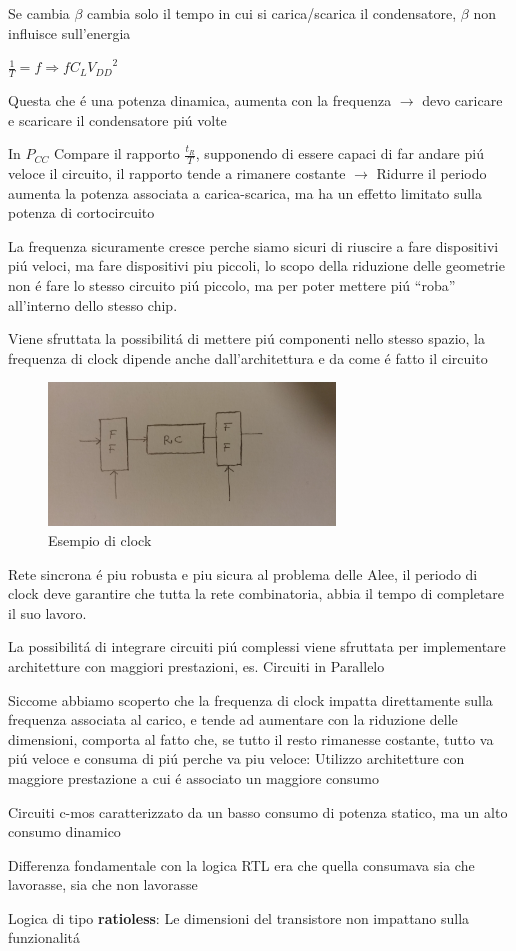 Se cambia $\beta$ cambia solo il tempo in cui si carica/scarica il condensatore, $\beta$ non influisce sull'energia

$ \frac{1}{T} = f  \Rightarrow  f C_L {V_{DD}}^2$

Questa che \'e una potenza dinamica, aumenta con la frequenza $\rightarrow$ devo caricare e scaricare il condensatore pi\'u volte

In $P_{CC}$ Compare il rapporto  $\frac{t_R}{T}$, supponendo di essere capaci di far andare pi\'u veloce il circuito, il rapporto tende a rimanere costante $\rightarrow$ Ridurre il periodo aumenta la potenza associata a carica-scarica, ma ha un effetto limitato sulla potenza di cortocircuito

La frequenza sicuramente cresce perche siamo sicuri di riuscire a fare dispositivi pi\'u veloci, ma fare dispositivi piu piccoli, lo scopo della riduzione delle geometrie non \'e fare lo stesso circuito pi\'u piccolo, ma per poter mettere pi\'u ``roba'' all'interno dello stesso chip.

Viene sfruttata la possibilit\'a di mettere pi\'u componenti nello stesso spazio, la frequenza di clock dipende anche dall'architettura e da come \'e fatto il circuito

\begin{figure}[ht]
    \centering
    \includegraphics[width=3in]{img/elettronica/esempio_clock.jpg}
    \caption{Esempio di clock}
\end{figure}

Rete sincrona \'e piu robusta e piu sicura al problema delle Alee, il periodo di clock deve garantire che tutta la rete combinatoria, abbia il tempo di completare il suo lavoro.

La possibilit\'a di integrare circuiti pi\'u complessi viene sfruttata per implementare architetture con maggiori prestazioni, es. Circuiti in Parallelo

Siccome abbiamo scoperto che la frequenza di clock impatta direttamente sulla frequenza associata al carico, e tende ad aumentare con la riduzione delle dimensioni, comporta al fatto che, se tutto il resto rimanesse costante, tutto va pi\'u veloce e consuma di pi\'u perche va piu veloce: Utilizzo architetture con maggiore prestazione a cui \'e associato un maggiore consumo

Circuiti c-mos caratterizzato da un basso consumo di potenza statico, ma un alto consumo dinamico

Differenza fondamentale con la logica RTL era che quella consumava sia che lavorasse, sia che non lavorasse

Logica di tipo \textbf{ratioless}: Le dimensioni del transistore non impattano sulla funzionalit\'a

